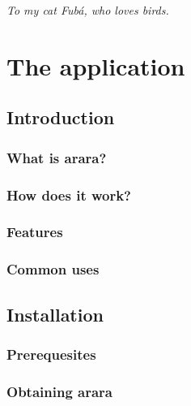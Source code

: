 \documentclass[a4paper,twoside,12pt]{memoir}
\begin{document}
\vspace*{25em}

\begin{flushright}
\em To my cat Fubá, who loves birds.
\end{flushright}

\cleardoublepage

\tableofcontents*

\cleardoublepage

\listoffigures*

\cleardoublepage

\listoftables*

\cleardoublepage

\listofcodes*

\mainmatter

\part{The application}

\chapter{Introduction}
\section{What is arara?}
\section{How does it work?}
\section{Features}
\section{Common uses}

\chapter{Installation}
\section{Prerequesites}
\section{Obtaining arara}
\end{document}

